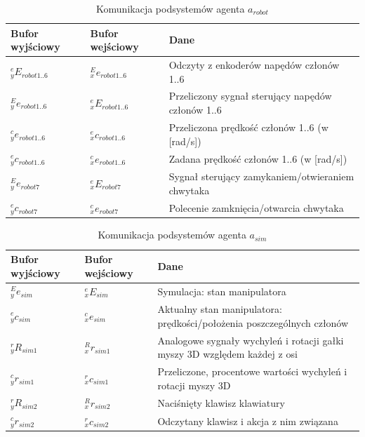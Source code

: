 \documentclass[a4paper, 12pt, twoside]{article}
\begin{document}
\begin{table}[htb!]
\begin{center}
\caption{Komunikacja podsystemów agenta $a_{robot}$}
\label{comrobot}
\begin{tabular}{ | l | l | p{6cm} |}
\hline
 Bufor wyjściowy & Bufor wejściowy & Dane \\ 
\hline
 $^e_yE_{robot1..6}$ & $^E_xe_{robot1..6}$ & Odczyty z enkoderów napędów członów 1..6\\ 
\hline
 $^E_ye_{robot1..6}$ & $^e_xE_{robot1..6}$ & Przeliczony sygnał sterujący napędów członów 1..6\\
\hline
 $^c_ye_{robot1..6}$ & $^e_xc_{robot1..6}$ & Przeliczona prędkość członów 1..6 (w [rad/s]) \\
\hline
 $^e_yc_{robot1..6}$ & $^c_xe_{robot1..6}$ & Zadana prędkość członów 1..6 (w [rad/s])\\ 
\hline
 $^E_ye_{robot7}$ & $^e_xE_{robot7}$ & Sygnał sterujący zamykaniem/otwieraniem chwytaka \\
\hline
 $^e_yc_{robot7}$ & $^c_xe_{robot7}$ & Polecenie zamknięcia/otwarcia chwytaka \\ 
\hline
\end{tabular}
\end{center}
\end{table}

\begin{table}[htb!]
\begin{center}
\caption{Komunikacja podsystemów agenta $a_{sim}$}
\label{comsim}
\begin{tabular}{ | l | l | p{6cm} |}
\hline
 Bufor wyjściowy & Bufor wejściowy & Dane \\ 
\hline
 $^E_ye_{sim}$ & $^e_xE_{sim}$ & Symulacja: stan manipulatora \\ 
\hline
 $^e_yc_{sim}$ & $^c_xe_{sim}$ & Aktualny stan manipulatora: prędkości/położenia poszczególnych członów \\
\hline
 $^r_yR_{sim1}$ & $^R_xr_{sim1}$ & Analogowe sygnały wychyleń i rotacji gałki myszy 3D względem każdej z osi \\
\hline
 $^c_yr_{sim1}$ & $^r_xc_{sim1}$ & Przeliczone, procentowe wartości wychyleń i rotacji myszy 3D \\ 
\hline
 $^r_yR_{sim2}$ & $^R_xr_{sim2}$ & Naciśnięty klawisz klawiatury \\
\hline
 $^c_yr_{sim2}$ & $^r_xc_{sim2}$ & Odczytany klawisz i akcja z nim związana \\ 
\hline
\end{tabular}
\end{center}
\end{table}
\end{document}
